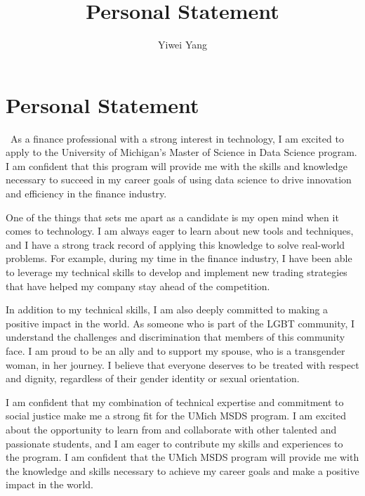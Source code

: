 \documentclass[a4paper,english]{article}
\title{Personal Statement}
\author{Yiwei Yang}
\def\centersec#1{\centering#1} %
\begin{document}
\section*{\centersec{Personal Statement}}
\quad \ As a finance professional with a strong interest in technology, I am excited to apply to the University of Michigan's Master of Science in Data Science program. I am confident that this program will provide me with the skills and knowledge necessary to succeed in my career goals of using data science to drive innovation and efficiency in the finance industry.

One of the things that sets me apart as a candidate is my open mind when it comes to technology. I am always eager to learn about new tools and techniques, and I have a strong track record of applying this knowledge to solve real-world problems. For example, during my time in the finance industry, I have been able to leverage my technical skills to develop and implement new trading strategies that have helped my company stay ahead of the competition.

In addition to my technical skills, I am also deeply committed to making a positive impact in the world. As someone who is part of the LGBT community, I understand the challenges and discrimination that members of this community face. I am proud to be an ally and to support my spouse, who is a transgender woman, in her journey. I believe that everyone deserves to be treated with respect and dignity, regardless of their gender identity or sexual orientation.

I am confident that my combination of technical expertise and commitment to social justice make me a strong fit for the UMich MSDS program. I am excited about the opportunity to learn from and collaborate with other talented and passionate students, and I am eager to contribute my skills and experiences to the program. I am confident that the UMich MSDS program will provide me with the knowledge and skills necessary to achieve my career goals and make a positive impact in the world.
\end{document}
